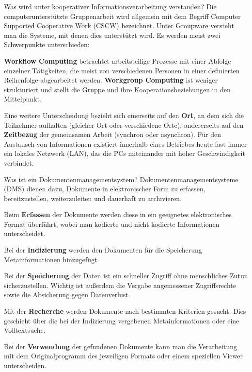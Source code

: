 \documentclass[a6paper,10pt,grid=front%
,toc
]{kartei}
\begin{document}
  \begin{karte}{Was wird unter kooperativer Informationsverarbeitung verstanden?}  
    Die computerunterstützte Gruppenarbeit wird allgemein mit dem Begriff Computer Supported Cooperative Work (CSCW) bezeichnet. Unter Groupware versteht man die Systeme, mit denen dies unterstützt wird. Es werden meist zwei Schwerpunkte unterschieden:
      
    \textbf{Workflow Computing} betrachtet arbeitsteilige Prozesse mit einer Abfolge einzelner Tätigkeiten, die meist von verschiedenen Personen in einer definierten Reihenfolge abgearbeitet werden.
    \textbf{Workgroup Computing} ist weniger strukturiert und stellt die Gruppe und ihre Kooperationsbeziehungen in den Mittelpunkt.

    Eine weitere Unterscheidung bezieht sich einerseits auf den \textbf{Ort}, an dem sich die Teilnehmer aufhalten (gleicher Ort oder verschiedene Orte), andererseits auf den \textbf{Zeitbezug} der gemeinsamen Arbeit (synchron oder asynchron). Für den Austausch von Informationen existiert innerhalb eines Betriebes heute fast immer ein lokales Netzwerk (LAN), das die PCs miteinander mit hoher Geschwindigkeit verbindet.
  \end{karte}

  \begin{karte}{Was ist ein Dokumentenmanagementsystem?}  
    Dokumentenmanagementsysteme (DMS) dienen dazu, Dokumente in elektronischer Form zu erfassen, bereitzustellen, weiterzuleiten und dauerhaft zu archivieren.

    Beim \textbf{Erfassen} der Dokumente werden diese in ein geeignetes elektronisches Format überführt, wobei man kodierte und nicht kodierte Informationen unterscheidet.
    
    Bei der \textbf{Indizierung} werden den Dokumenten für die Speicherung Metainformationen hinzugefügt.

    Bei der \textbf{Speicherung} der Daten ist ein schneller Zugriff ohne menschliches Zutun sicherzustellen. Wichtig ist außerdem die Vergabe angemessener Zugriffsrechte sowie die Absicherung gegen Datenverlust.

    Mit der \textbf{Recherche} werden Dokumente nach bestimmten Kriterien gesucht. Dies geschieht über die bei der Indizierung vergebenen Metainformationen oder eine Volltextsuche.
    
    Bei der \textbf{Verwendung} der gefundenen Dokumente kann man die Verarbeitung mit dem Originalprogramm des jeweiligen Formats oder einem speziellen Viewer unterscheiden.
  \end{karte}
\end{document}
